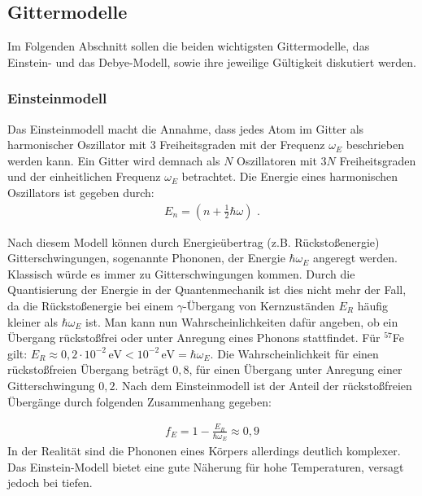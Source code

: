
\subsection{Gittermodelle}

Im Folgenden Abschnitt sollen die beiden wichtigsten Gittermodelle, das Einstein- und das Debye-Modell, sowie ihre jeweilige Gültigkeit diskutiert werden. \cite{morris}

\subsubsection{Einsteinmodell}

Das Einsteinmodell macht die Annahme, dass jedes Atom im Gitter als harmonischer Oszillator mit $3$ Freiheitsgraden mit der Frequenz $\omega_E$ beschrieben werden kann. Ein Gitter wird demnach als $N$ Oszillatoren mit $3N$ Freiheitsgraden und der einheitlichen Frequenz $\omega_E$ betrachtet. Die Energie eines harmonischen Oszillators ist gegeben durch:
\begin{align}
E_n=\left( n+\frac{1}{2}\hbar\omega\right) \text{ .}
\end{align} 

Nach diesem Modell können durch Energieübertrag (z.B. Rückstoßenergie) Gitterschwingungen, sogenannte Phononen, der Energie $\hbar \omega_E$ angeregt werden. Klassisch würde es immer zu Gitterschwingungen kommen. Durch die Quantisierung der Energie in der Quantenmechanik ist dies nicht mehr der Fall, da die Rückstoßenergie bei einem $\gamma$-Übergang von Kernzuständen $E_R$ häufig kleiner als $\hbar \omega_E$ ist. Man kann nun Wahrscheinlichkeiten dafür angeben, ob ein Übergang rückstoßfrei oder unter Anregung eines Phonons stattfindet. Für $^{57}$Fe gilt:
$E_R\approx0,2\cdot10^{-2}\,\mathrm{eV} < 10^{-2}\,\mathrm{eV}=\hbar\omega_E $. Die Wahrscheinlichkeit für einen rückstoßfreien Übergang beträgt $0,8$, für einen Übergang unter Anregung einer Gitterschwingung $0,2$. Nach dem Einsteinmodell ist der Anteil der rückstoßfreien Übergänge durch folgenden Zusammenhang gegeben:

\begin{align}
f_E = 1-\frac{E_R}{\hbar \omega_E}\approx0,9
\end{align}
In der Realität sind die Phononen eines Körpers allerdings deutlich komplexer. Das Einstein-Modell bietet eine gute Näherung für hohe Temperaturen, versagt jedoch bei tiefen.

